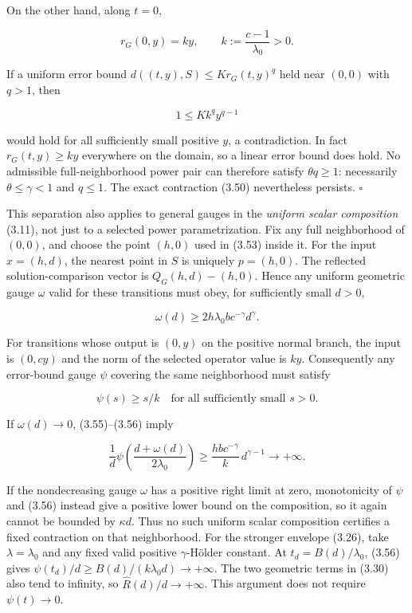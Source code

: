 \documentclass[11pt,a4paper]{article}
\theoremstyle{plain}
\theoremstyle{definition}
\theoremstyle{remark}
\begin{document}
On the other hand, along \(t=0\),

\[
r_G(0,y)=ky,\qquad k:=\frac{c-1}{\lambda_0}>0.
\tag{3.54}
\]

If a uniform error bound \(d((t,y),S)\le K r_G(t,y)^q\) held near
\((0,0)\) with \(q>1\), then

\[
1\le Kk^q y^{q-1}
\]

would hold for all sufficiently small positive \(y\), a contradiction.
In fact \(r_G(t,y)\ge ky\) everywhere on the domain, so a linear error
bound does hold. No admissible full-neighborhood power pair can
therefore satisfy \(\theta q\ge1\): necessarily \(\theta\le\gamma<1\)
and \(q\le1\). The exact contraction (3.50) nevertheless persists.
\(\square\)

This separation also applies to general gauges in the \emph{uniform
scalar composition} (3.11), not just to a selected power
parametrization. Fix any full neighborhood of \((0,0)\), and choose the
point \((h,0)\) used in (3.53) inside it. For the input \(x=(h,d)\), the
nearest point in \(S\) is uniquely \(p=(h,0)\). The reflected
solution-comparison vector is \(Q_G(h,d)-(h,0)\). Hence any uniform
geometric gauge \(\omega\) valid for these transitions must obey, for
sufficiently small \(d>0\),

\[
\omega(d)\ge2h\lambda_0bc^{-\gamma}d^\gamma.
\tag{3.55}
\]

For transitions whose output is \((0,y)\) on the positive normal branch,
the input is \((0,cy)\) and the norm of the selected operator value is \(ky\).
Consequently any error-bound gauge \(\psi\) covering the same
neighborhood must satisfy

\[
\psi(s)\ge s/k
\quad\text{for all sufficiently small }s>0.
\tag{3.56}
\]

If \(\omega(d)\to0\), (3.55)--(3.56) imply

\[
\frac{1}{d}\psi\!\left(\frac{d+\omega(d)}{2\lambda_0}\right)
\ge\frac{hb c^{-\gamma}}{k}\,d^{\gamma-1}
\longrightarrow+\infty.
\tag{3.57}
\]

If the nondecreasing gauge \(\omega\) has a positive right limit at
zero, monotonicity of \(\psi\) and (3.56) instead give a positive lower
bound on the composition, so it again cannot be bounded by \(\kappa d\).
Thus no such uniform scalar composition certifies a fixed contraction on
that neighborhood. For the stronger envelope (3.26), take
\(\lambda=\lambda_0\) and any fixed valid positive \(\gamma\)-Hölder
constant. At \(t_d=B(d)/\lambda_0\), (3.56) gives
\(\psi(t_d)/d\ge B(d)/(k\lambda_0d)\to+\infty\). The two geometric terms
in (3.30) also tend to infinity, so \(\widehat R(d)/d\to+\infty\). This
argument does not require \(\psi(t)\to0\).
\end{document}
